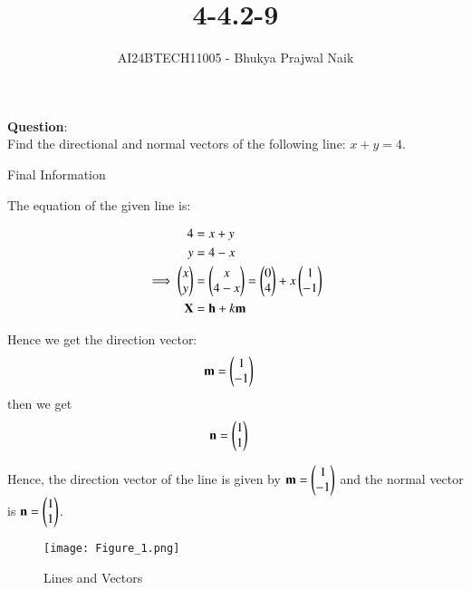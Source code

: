 \documentclass[journal]{IEEEtran}
\begin{document}

\vspace{3cm}

\title{4-4.2-9}
\author{AI24BTECH11005 - Bhukya Prajwal Naik
}
{\let\newpage\relax\maketitle}

\renewcommand{\thefigure}{\theenumi}
\renewcommand{\thetable}{\theenumi}
\setlength{\intextsep}{10pt} %


\renewcommand{\thetable}{\theenumi}


\textbf{Question}:\\
 Find the directional and normal vectors of the following line: $x+y=4$.
\solution

\begin{table}[h!]
	\centering
	
	\caption{Final Information}
	\label{4-4,2-9-tab-0}
\end{table}


The equation of the given line is:

\begin{align}
	4 &= x+y \\
	y &= 4-x \\
	\implies \begin{pmatrix}x \\ y\end{pmatrix} &= \begin{pmatrix}x \\ 4-x\end{pmatrix} =\begin{pmatrix}0 \\ 4\end{pmatrix} +x\begin{pmatrix}1 \\ -1\end{pmatrix} \\
	\mathbf{X} &= \mathbf{h} +k\mathbf{m}
\end{align}

Hence we get the direction vector:
\begin{align}
	\mathbf{m} &= \begin{pmatrix}1 \\ -1\end{pmatrix}
\end{align}
then we get 
\begin{align}
	\mathbf{n} &= \begin{pmatrix}1 \\ 1\end{pmatrix}
\end{align}


Hence, the direction vector of the line is given by $\mathbf{m} = \begin{pmatrix}1 \\ -1\end{pmatrix}$ and the normal vector is $\mathbf{n} = \begin{pmatrix}1 \\ 1\end{pmatrix}$.
\begin{figure}[h!]
	\centering
	\texttt{[image: Figure\_1.png]}
	\label{Graph}
	\caption{Lines and Vectors}
        \end{figure}
\end{document}
